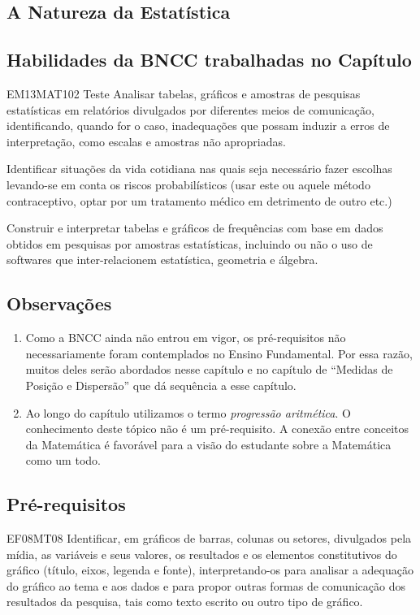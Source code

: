 \begin{apresentacao}
\section{A Natureza da Estatística}
\subsection{Habilidades da BNCC trabalhadas no Capítulo}
\begin{habilities}{EM13MAT102}
Teste Analisar tabelas, gráficos e amostras de pesquisas estatísticas em relatórios divulgados por diferentes meios de comunicação, identificando, quando for o caso, inadequações que possam induzir a erros de interpretação, como escalas e amostras não apropriadas.

 Identificar situações da vida cotidiana nas quais seja necessário fazer escolhas levando-se em conta os riscos probabilísticos (usar este ou aquele método contraceptivo, optar por um tratamento médico em detrimento de outro etc.)

 Construir e interpretar tabelas e gráficos de frequências com base em dados obtidos em pesquisas por amostras estatísticas, incluindo ou não o uso de softwares que inter-relacionem estatística, geometria e álgebra.

\end{habilities}

\subsection{Observações}
\begin{enumerate}
\item {} 
Como a BNCC ainda não entrou em vigor, os pré-requisitos não necessariamente foram contemplados no Ensino Fundamental. Por essa razão, muitos deles serão abordados nesse capítulo e no capítulo de “Medidas de Posição e Dispersão” que dá sequência a esse capítulo.

\item {} 
Ao longo do capítulo utilizamos o termo \textit{progressão aritmética}. O conhecimento deste tópico não é um pré-requisito. A conexão entre conceitos da Matemática é favorável para a visão do estudante sobre a Matemática como um todo.

\end{enumerate}

\subsection{Pré-requisitos}
\begin{habilities}{EF08MT08}
Identificar, em gráficos de barras, colunas ou setores, divulgados pela mídia, as variáveis e seus valores, os resultados e os elementos constitutivos do gráfico (título, eixos, legenda e fonte), interpretando-os para analisar a adequação do gráfico ao tema e aos dados e para propor outras formas de comunicação dos resultados da pesquisa, tais como texto escrito ou outro tipo de gráfico.


\end{habilities}
\end{apresentacao}
